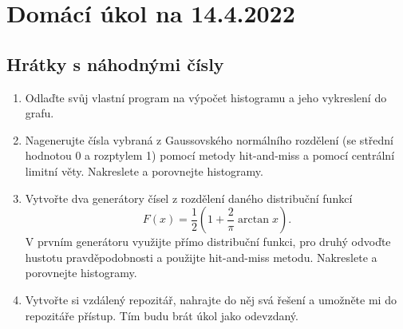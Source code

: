 \documentclass[a4paper,11pt,twoside]{article}
\begin{document}
\section*{Domácí úkol na 14.4.2022}
\subsection*{Hrátky s náhodnými čísly}
\begin{enumerate}
    \item
        Odlaďte svůj vlastní program na výpočet histogramu a jeho vykreslení do grafu.

    \item
        Nagenerujte čísla vybraná z Gaussovského normálního rozdělení (se střední hodnotou 0 a rozptylem 1) pomocí metody hit-and-miss a pomocí centrální limitní věty.
        Nakreslete a porovnejte histogramy.

    \item
        Vytvořte dva generátory čísel z rozdělení daného distribuční funkcí
        \begin{equation*}
            F(x)=\frac{1}{2}\left(1+\frac{2}{\pi}\arctan{x}\right).
        \end{equation*}
        V prvním generátoru využijte přímo distribuční funkci, pro druhý odvoďte hustotu pravděpodobnosti a použijte hit-and-miss metodu.
        Nakreslete a porovnejte histogramy.

    \item
        Vytvořte si vzdálený repozitář, nahrajte do něj svá řešení a umožněte mi do repozitáře přístup.
        Tím budu brát úkol jako odevzdaný.
\end{enumerate}
\end{document}
